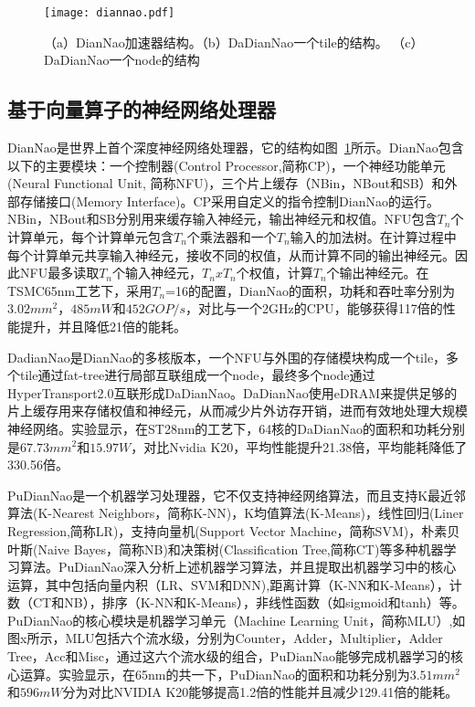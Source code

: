 \begin{figure}[t]
  \centering
  \texttt{[image: diannao.pdf]}
  \caption{\footnotesize （a）DianNao加速器结构。（b）DaDianNao一个tile的结构。 （c）DaDianNao一个node的结构}
  \label{fig:diannao}
\end{figure}

\subsection{基于向量算子的神经网络处理器}
DianNao是世界上首个深度神经网络处理器，它的结构如图~\ref{fig:diannao}所示。DianNao包含以下的主要模块：一个控制器(Control Processor,简称CP)，一个神经功能单元(Neural Functional Unit, 简称NFU)，三个片上缓存（NBin，NBout和SB）和外部存储接口(Memory Interface)。CP采用自定义的指令控制DianNao的运行。NBin，NBout和SB分别用来缓存输入神经元，输出神经元和权值。NFU包含$T_n$个计算单元，每个计算单元包含$T_n$个乘法器和一个$T_n$输入的加法树。在计算过程中每个计算单元共享输入神经元，接收不同的权值，从而计算不同的输出神经元。因此NFU最多读取$T_n$个输入神经元，$T_nxT_n$个权值，计算$T_n$个输出神经元。在TSMC65nm工艺下，采用$T_n$=16的配置，DianNao的面积，功耗和吞吐率分别为$3.02mm^2$，$485mW$和$452GOP/s$，对比与一个2GHz的CPU，能够获得117倍的性能提升，并且降低21倍的能耗。

DadianNao是DianNao的多核版本，一个NFU与外围的存储模块构成一个tile，多个tile通过fat-tree进行局部互联组成一个node，最终多个node通过HyperTransport2.0互联形成DaDianNao。DaDianNao使用eDRAM来提供足够的片上缓存用来存储权值和神经元，从而减少片外访存开销，进而有效地处理大规模神经网络。实验显示，在ST28nm的工艺下，64核的DaDianNao的面积和功耗分别是$67.73mm^2$和$15.97W$，对比Nvidia K20，平均性能提升21.38倍，平均能耗降低了330.56倍。

PuDianNao是一个机器学习处理器，它不仅支持神经网络算法，而且支持K最近邻算法(K-Nearest Neighbors，简称K-NN)，K均值算法(K-Means)，线性回归(Liner Regression,简称LR)，支持向量机(Support Vector Machine，简称SVM)，朴素贝叶斯(Naive Bayes，简称NB)和决策树(Classification Tree,简称CT)等多种机器学习算法。PuDianNao深入分析上述机器学习算法，并且提取出机器学习中的核心运算，其中包括向量内积（LR、SVM和DNN),距离计算（K-NN和K-Means），计数（CT和NB），排序（K-NN和K-Means），非线性函数（如sigmoid和tanh）等。PuDianNao的核心模块是机器学习单元（Machine Learning Unit，简称MLU）,如图x所示，MLU包括六个流水级，分别为Counter，Adder，Multiplier，Adder Tree，Acc和Misc，通过这六个流水级的组合，PuDianNao能够完成机器学习的核心运算。实验显示，在65nm的共一下，PuDianNao的面积和功耗分别为$3.51mm^2$和$596mW$分为对比NVIDIA K20能够提高1.2倍的性能并且减少129.41倍的能耗。

